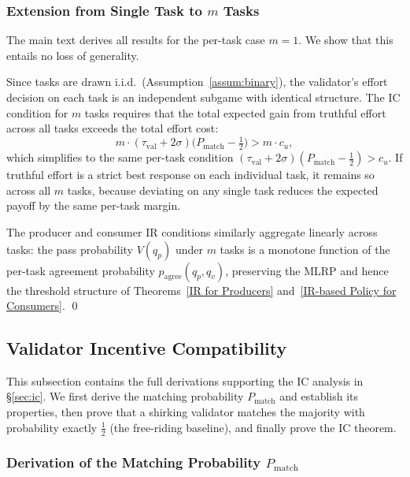 \subsubsection{Extension from Single Task to $m$ Tasks}
\label{app:m_extension}

The main text derives all results for the per-task case $m = 1$. We show that this entails no loss of generality.

Since tasks are drawn i.i.d.\ (Assumption~\ref{assum:binary}), the validator's effort decision on each task is an independent subgame with identical structure. The IC condition for $m$ tasks requires that the total expected gain from truthful effort across all tasks exceeds the total effort cost:
\[
m \cdot (\tau_{\text{val}} + 2\sigma)\bigl(P_{\text{match}} - \tfrac{1}{2}\bigr) > m \cdot c_u,
\]
which simplifies to the same per-task condition $(\tau_{\text{val}} + 2\sigma)(P_{\text{match}} - \tfrac{1}{2}) > c_u$. If truthful effort is a strict best response on each individual task, it remains so across all $m$ tasks, because deviating on any single task reduces the expected payoff by the same per-task margin.

The producer and consumer IR conditions similarly aggregate linearly across tasks: the pass probability $V(q_p)$ under $m$ tasks is a monotone function of the per-task agreement probability $p_{\text{agree}}(q_p, q_v)$, preserving the MLRP and hence the threshold structure of Theorems~\ref{IR for Producers} and~\ref{IR-based Policy for Consumers}. \qed


\subsection{Validator Incentive Compatibility}
\label{app:ic_proofs}

This subsection contains the full derivations supporting the IC analysis in \S\ref{sec:ic}. We first derive the matching probability $P_{\text{match}}$ and establish its properties, then prove that a shirking validator matches the majority with probability exactly $\frac{1}{2}$ (the free-riding baseline), and finally prove the IC theorem.

\subsubsection{Derivation of the Matching Probability $P_{\text{match}}$}
\label{app:pmatch_derivation}

